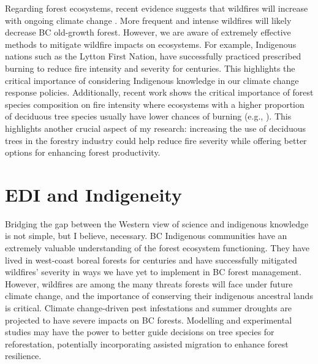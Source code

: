 \documentclass[11pt,letter]{article}
\begin{document}
Regarding forest ecosystems, recent evidence suggests that wildfires will increase with ongoing climate change \citep{wasserman_climate_2023}. More frequent and intense wildfires will likely decrease BC old-growth forest. \citep{price_conflicting_2021} However, we are aware of extremely effective methods to mitigate wildfire impacts on ecosystems. For example, Indigenous nations such as the Lytton First Nation, have successfully practiced prescribed burning to reduce fire intensity and severity for centuries. \citep{lewis_return_2018} This highlights the critical importance of considering Indigenous knowledge in our climate change response policies. 
Additionally, recent work shows the critical importance of forest species composition on fire intensity where ecosystems with a higher proportion of deciduous tree species usually have lower chances of burning (e.g., \citep{park_impact_2024}). This highlights another crucial aspect of my research: increasing the use of deciduous trees in the forestry industry could help reduce fire severity while offering better options for enhancing forest productivity.



\section *{EDI and Indigeneity}
Bridging the gap between the Western view of science and indigenous knowledge is not simple, but I believe, necessary. BC Indigenous communities have an extremely valuable understanding of the forest ecosystem functioning. They have lived in west-coast boreal forests for centuries and have successfully mitigated wildfires' severity in ways we have yet to implement in BC forest management. However, wildfires are among the many threats forests will face under future climate change, and the importance of conserving their indigenous ancestral lands is critical. Climate change-driven pest infestations and summer droughts are projected to have severe impacts on BC forests. \citep{williams_climate_2002} Modelling and experimental studies may have the power to better guide decisions on tree species for reforestation, potentially incorporating assisted migration to enhance forest resilience. \citep{aitken_time_2016}
\end{document}
